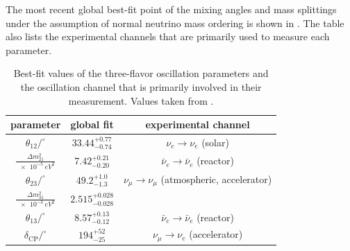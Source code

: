 The most recent global best-fit point\cite{Esteban:2020cvm} of the mixing angles and mass splittings under the assumption of normal neutrino mass ordering is shown in .
The table also lists the experimental channels that are primarily used to measure each parameter.
\begin{table}
\caption{Best-fit values of the three-flavor oscillation parameters and the oscillation channel that is primarily involved in their measurement. Values taken from \cite{Esteban:2020cvm}.\label{tab:global-bfp}}
\begin{tabular}{ccc}\toprule
    parameter & global fit & experimental channel \\ \midrule
    $\theta_{12}/^\circ$                    & $33.44^{+0.77}_{-0.74}$   & $\nu_e \rightarrow \nu_e$ (solar)\\
    $\frac{\Delta m^2_{21}}{\SI{e-5}{eV^2}}$& $7.42^{+0.21}_{-0.20}$    & $\bar{\nu}_e \rightarrow \bar{\nu}_e$ (reactor)\\
    $\theta_{23}/^\circ$                    & $49.2^{+1.0}_{-1.3} $     & $\nu_\mu \rightarrow \nu_\mu$  (atmospheric, accelerator)\\
    $\frac{\Delta m^2_{31}}{\SI{e-3}{eV^2}}$& $2.515^{+0.028}_{-0.028}$ & \\
    $\theta_{13}/^\circ$                    & $8.57^{+0.13}_{-0.12} $   & $\bar{\nu}_e \rightarrow \bar{\nu}_e$ (reactor)\\
    $\delta_\mathrm{CP}/^\circ$             & $194^{+52}_{-25}$         & $\nu_\mu \rightarrow \nu_e$ (accelerator)\\ \bottomrule
\end{tabular}
\end{table}

